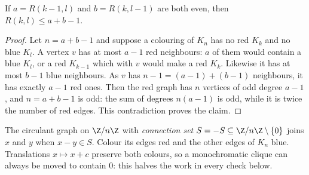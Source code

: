 \begin{proposition}\label{extremal:prop:ramseyparity}
If $a=R(k-1,l)$ and $b=R(k,l-1)$ are both even, then $R(k,l)\le a+b-1$.
\end{proposition}
\begin{proof}
Let $n=a+b-1$ and suppose a colouring of $K_n$ has no red $K_k$ and no blue $K_l$. A vertex $v$ has at most $a-1$ red neighbours: $a$ of them would contain a
blue $K_l$, or a red $K_{k-1}$ which with $v$ would make a red $K_k$. Likewise it has at most $b-1$ blue neighbours. As $v$ has $n-1=(a-1)+(b-1)$ neighbours, it has
exactly $a-1$ red ones. Then the red graph has $n$ vertices of odd degree $a-1$, and $n=a+b-1$ is odd: the sum of degrees $n(a-1)$ is odd, while it is twice the number
of red edges. This contradiction proves the claim.
\end{proof}

The circulant graph on $\Z/n\Z$ with \emph{connection set} $S=-S\subseteq\Z/n\Z\setminus\{0\}$ joins $x$ and $y$ when $x-y\in S$. Colour its edges red and the other edges of $K_n$ blue.
Translations $x\mapsto x+c$ preserve both colours, so a monochromatic clique can always be moved to contain $0$: this halves the work in every check below.

